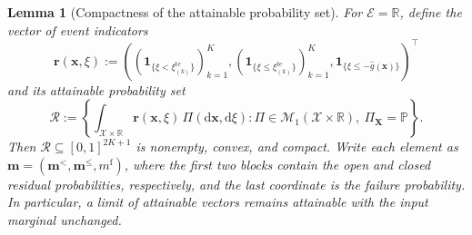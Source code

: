\documentclass[review,11pt,3p,authoryear,nopreprintline]{elsarticle}
\newtheorem{lemma}{Lemma}
\begin{document}
\begin{lemma}[Compactness of the attainable probability set]
  \label{lem-attainable-probabilities}
  For $\mathcal E=\mathbb R$, define the vector of event indicators
  \begin{equation}
    \bm r(\bm x,\xi):=
    \left(
      \left(\mathbf1_{\{\xi<\xi_{(k)}^{\mathrm{te}}\}}\right)_{k=1}^K,
      \left(\mathbf1_{\{\xi\le\xi_{(k)}^{\mathrm{te}}\}}\right)_{k=1}^K,
      \mathbf1_{\{\xi\le-\hat g(\bm x)\}}
    \right)^\top
    \label{eq-event-probability-vector}
  \end{equation}
  and its attainable probability set
  \begin{equation}
    \mathcal R:=\left\{
      \int_{\mathcal X\times\mathbb R}\bm r(\bm x,\xi)\,\Pi(\mathrm d\bm x,\mathrm d\xi):
      \Pi\in\mathcal M_1(\mathcal X\times\mathbb R),\ \Pi_{\bm X}=\mathbb P
    \right\}.
    \label{eq-attainable-probability-set}
  \end{equation}
  Then $\mathcal R\subseteq[0,1]^{2K+1}$ is nonempty, convex, and compact. Write each element as $\bm m=(\bm m^{<},\bm m^{\le},m^{\mathrm f})$, where the first two blocks contain the open and closed residual probabilities, respectively, and the last coordinate is the failure probability. In particular, a limit of attainable vectors remains attainable with the input marginal unchanged.
\end{lemma}
\end{document}
